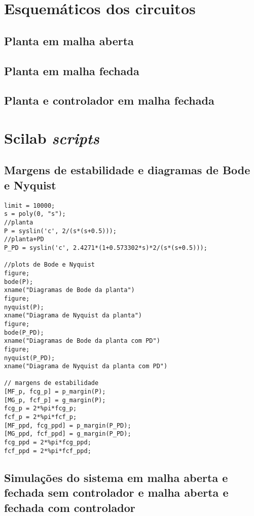 \appendix
\section{Esquemáticos dos circuitos}

\subsection{Planta em malha aberta}

\subsection{Planta em malha fechada}

\subsection{Planta e controlador em malha fechada}

\pagebreak

\section{Scilab \textit{scripts}}

\subsection{Margens de estabilidade e diagramas de Bode e Nyquist}

\begin{lstlisting}
limit = 10000;
s = poly(0, "s");
//planta
P = syslin('c', 2/(s*(s+0.5)));
//planta+PD
P_PD = syslin('c', 2.4271*(1+0.573302*s)*2/(s*(s+0.5)));

//plots de Bode e Nyquist
figure;
bode(P);
xname("Diagramas de Bode da planta")
figure;
nyquist(P);
xname("Diagrama de Nyquist da planta")
figure;
bode(P_PD);
xname("Diagramas de Bode da planta com PD")
figure;
nyquist(P_PD);
xname("Diagrama de Nyquist da planta com PD")

// margens de estabilidade
[MF_p, fcg_p] = p_margin(P);
[MG_p, fcf_p] = g_margin(P);
fcg_p = 2*%pi*fcg_p;
fcf_p = 2*%pi*fcf_p;
[MF_ppd, fcg_ppd] = p_margin(P_PD);
[MG_ppd, fcf_ppd] = g_margin(P_PD);
fcg_ppd = 2*%pi*fcg_ppd;
fcf_ppd = 2*%pi*fcf_ppd;

\end{lstlisting}

\subsection{Simulações do sistema em malha aberta e fechada sem controlador e malha aberta e fechada com controlador}

